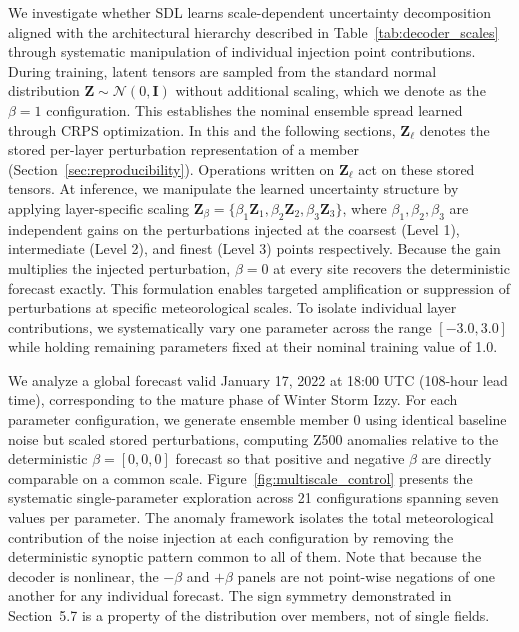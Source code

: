 \documentclass{agujournal2019}
\begin{document}
We investigate whether SDL learns scale-dependent uncertainty decomposition aligned with the architectural hierarchy described in Table~\ref{tab:decoder_scales} through systematic manipulation of individual injection point contributions. During training, latent tensors are sampled from the standard normal distribution $\mathbf{Z} \sim \mathcal{N}(0, \mathbf{I})$ without additional scaling, which we denote as the $\beta = 1$ configuration. This establishes the nominal ensemble spread learned through CRPS optimization. In this and the following sections, $\mathbf{Z}_\ell$ denotes the stored per-layer perturbation representation of a member (Section~\ref{sec:reproducibility}). Operations written on $\mathbf{Z}_\ell$ act on these stored tensors. At inference, we manipulate the learned uncertainty structure by applying layer-specific scaling $\mathbf{Z}_\beta = \{\beta_1\mathbf{Z}_1, \beta_2\mathbf{Z}_2, \beta_3\mathbf{Z}_3\}$, where $\beta_1, \beta_2, \beta_3$ are independent gains on the perturbations injected at the coarsest (Level 1), intermediate (Level 2), and finest (Level 3) points respectively. Because the gain multiplies the injected perturbation, $\beta = 0$ at every site recovers the deterministic forecast exactly. This formulation enables targeted amplification or suppression of perturbations at specific meteorological scales. To isolate individual layer contributions, we systematically vary one parameter across the range $[-3.0, 3.0]$ while holding remaining parameters fixed at their nominal training value of 1.0.


We analyze a global forecast valid January 17, 2022 at 18:00 UTC (108-hour lead time), corresponding to the mature phase of Winter Storm Izzy. For each parameter configuration, we generate ensemble member 0 using identical baseline noise but scaled stored perturbations, computing Z500 anomalies relative to the deterministic $\beta=[0,0,0]$ forecast so that positive and negative $\beta$ are directly comparable on a common scale. Figure~\ref{fig:multiscale_control} presents the systematic single-parameter exploration across 21 configurations spanning seven values per parameter. The anomaly framework isolates the total meteorological contribution of the noise injection at each configuration by removing the deterministic synoptic pattern common to all of them. Note that because the decoder is nonlinear, the $-\beta$ and $+\beta$ panels are not point-wise negations of one another for any individual forecast. The sign symmetry demonstrated in Section~5.7 is a property of the distribution over members, not of single fields.
\end{document}
